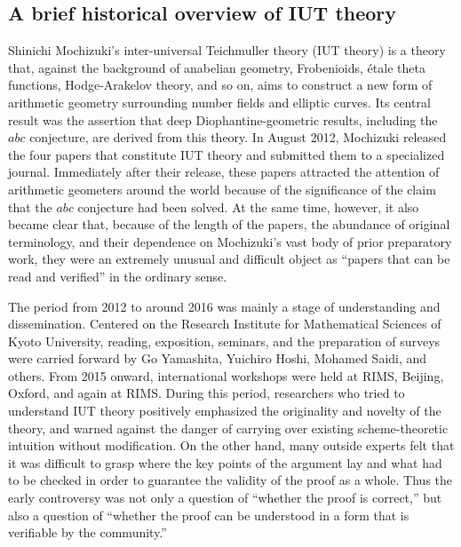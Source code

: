 \documentclass[12pt, reqno, a4paper]{amsart}
\begin{document}
\subsection{A brief historical overview of IUT theory}
Shinichi Mochizuki's inter-universal Teichmuller theory (IUT theory) is a theory that, against the background of anabelian geometry, Frobenioids, \'etale theta functions, Hodge-Arakelov theory, and so on, aims to construct a new form of arithmetic geometry surrounding number fields and elliptic curves. Its central result was the assertion that deep Diophantine-geometric results, including the $abc$ conjecture, are derived from this theory. In August 2012, Mochizuki released the four papers that constitute IUT theory and submitted them to a specialized journal. Immediately after their release, these papers attracted the attention of arithmetic geometers around the world because of the significance of the claim that the $abc$ conjecture had been solved. At the same time, however, it also became clear that, because of the length of the papers, the abundance of original terminology, and their dependence on Mochizuki's vast body of prior preparatory work, they were an extremely unusual and difficult object as ``papers that can be read and verified'' in the ordinary sense.

The period from 2012 to around 2016 was mainly a stage of understanding and dissemination. Centered on the Research Institute for Mathematical Sciences of Kyoto University, reading, exposition, seminars, and the preparation of surveys were carried forward by Go Yamashita, Yuichiro Hoshi, Mohamed Saidi, and others. From 2015 onward, international workshops were held at RIMS, Beijing, Oxford, and again at RIMS. During this period, researchers who tried to understand IUT theory positively emphasized the originality and novelty of the theory, and warned against the danger of carrying over existing scheme-theoretic intuition without modification. On the other hand, many outside experts felt that it was difficult to grasp where the key points of the argument lay and what had to be checked in order to guarantee the validity of the proof as a whole. Thus the early controversy was not only a question of ``whether the proof is correct,'' but also a question of ``whether the proof can be understood in a form that is verifiable by the community.''
\end{document}
